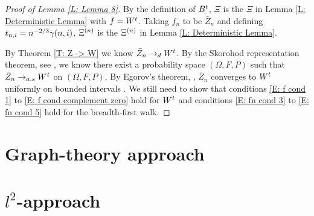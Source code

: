 \begin{proof}[Proof of Lemma \ref{L: Lemma 8}]
	By the definition of $B^t$, 
	$\Xi$ is the $\Xi$ in Lemma \ref{L: Deterministic Lemma} with $f = W^t$.
	Taking $f_n$ to be $\bar{Z}_n$ and defining $t_{n, i} = n^{-2 / 3} \gamma(n,i)$,
	$\Xi^{(n)}$ is the $\Xi^{(n)}$ in Lemma \ref{L: Deterministic Lemma}.
	
	By Theorem \ref{T: Z -> W} we know $\bar{Z}_n \rightarrow_d W^t$.
	By the Skorohod representation theorem,
	see \cite{Billingsley2009}, 
	we know there exist a probability space $(\Omega, F, P)$ such that
	$\bar{Z}_n \rightarrow_{a.s} W^t$ on $(\Omega, F, P)$.
	By Egorov's theorem, \cite{Someting},
	$\bar{Z}_n$ converges to $W^t$ uniformly on bounded intervals .
	We still need to show that conditions \eqref{E: f cond 1} to \eqref{E: f cond complement zero} hold for $W^t$
	and conditions \eqref{E: fn cond 3} to \eqref{E: fn cond 5} hold for the breadth-first walk.
	
	
	
\end{proof}

















\section{Graph-theory approach}

\section{$l^2$-approach}